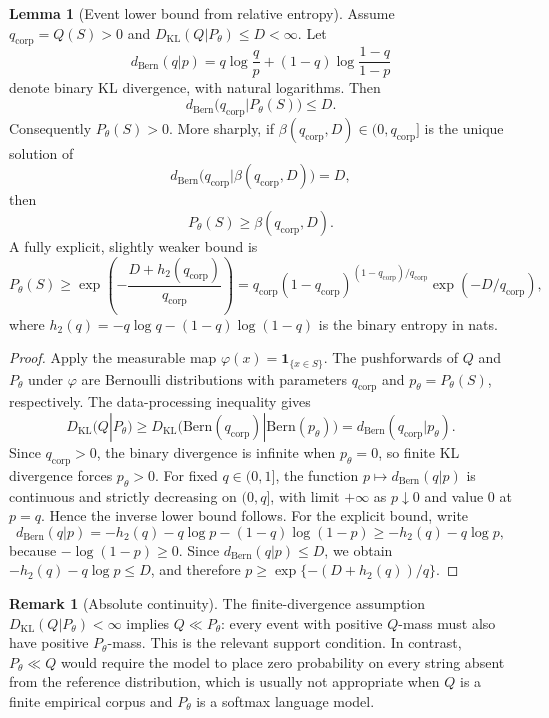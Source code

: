 \documentclass[12pt]{article}
\theoremstyle{definition}
\newtheorem{lemma}{Lemma}[section]
\newtheorem{remark}{Remark}[section]
\begin{document}
\begin{lemma}[Event lower bound from relative entropy]
\label{lem:invalidation-floor}
Assume $q_{\mathrm{corp}}=Q(S)>0$ and
$D_{\mathrm{KL}}(Q|P_\theta)\le D<\infty$.  Let
\[
 d_{\mathrm{Bern}}(q|p)
 =q\log\frac{q}{p}+(1-q)\log\frac{1-q}{1-p}
\]
denote binary KL divergence, with natural logarithms.  Then
\[
 d_{\mathrm{Bern}}\bigl(q_{\mathrm{corp}}|P_\theta(S)\bigr)\le D.
\]
Consequently $P_\theta(S)>0$.  More sharply, if
$\beta(q_{\mathrm{corp}},D)\in(0,q_{\mathrm{corp}}]$ is the unique solution of
\[
 d_{\mathrm{Bern}}\bigl(q_{\mathrm{corp}}|\beta(q_{\mathrm{corp}},D)\bigr)=D,
\]
then
\[
    P_\theta(S)\ge \beta(q_{\mathrm{corp}},D).
\]
A fully explicit, slightly weaker bound is
\[
 P_\theta(S)
 \ge
 \exp\left(-\frac{D+h_2(q_{\mathrm{corp}})}{q_{\mathrm{corp}}}\right)
 =q_{\mathrm{corp}}(1-q_{\mathrm{corp}})^{(1-q_{\mathrm{corp}})/q_{\mathrm{corp}}}
   \exp(-D/q_{\mathrm{corp}}),
\]
where $h_2(q)=-q\log q-(1-q)\log(1-q)$ is the binary entropy in nats.
\end{lemma}

\begin{proof}
Apply the measurable map $\varphi(x)=\mathbf 1_{\{x\in S\}}$.  The pushforwards
of $Q$ and $P_\theta$ under $\varphi$ are Bernoulli distributions with
parameters $q_{\mathrm{corp}}$ and $p_\theta=P_\theta(S)$, respectively.  The
data-processing inequality gives
\[
D_{\mathrm{KL}}(Q|P_\theta)
\ge
D_{\mathrm{KL}}\bigl(\mathrm{Bern}(q_{\mathrm{corp}})|\mathrm{Bern}(p_\theta)\bigr)
=
d_{\mathrm{Bern}}(q_{\mathrm{corp}}|p_\theta).
\]
Since $q_{\mathrm{corp}}>0$, the binary divergence is infinite when
$p_\theta=0$, so finite KL divergence forces $p_\theta>0$.  For fixed
$q\in(0,1]$, the function $p\mapsto d_{\mathrm{Bern}}(q|p)$ is continuous and
strictly decreasing on $(0,q]$, with limit $+\infty$ as $p\downarrow0$ and
value $0$ at $p=q$.  Hence the inverse lower bound follows.  For the explicit
bound, write
\[
 d_{\mathrm{Bern}}(q|p)
 =-h_2(q)-q\log p-(1-q)\log(1-p)
 \ge -h_2(q)-q\log p,
\]
because $-\log(1-p)\ge0$.  Since $d_{\mathrm{Bern}}(q|p)\le D$, we obtain
$-h_2(q)-q\log p\le D$, and therefore
$p\ge \exp\{-(D+h_2(q))/q\}$.
\end{proof}

\begin{remark}[Absolute continuity]
The finite-divergence assumption $D_{\mathrm{KL}}(Q|P_\theta)<\infty$ implies
$Q\ll P_\theta$: every event with positive $Q$-mass must also have positive
$P_\theta$-mass.  This is the relevant support condition.  In contrast,
$P_\theta\ll Q$ would require the model to place zero probability on every
string absent from the reference distribution, which is usually not appropriate
when $Q$ is a finite empirical corpus and $P_\theta$ is a softmax language model.
\end{remark}
\end{document}
